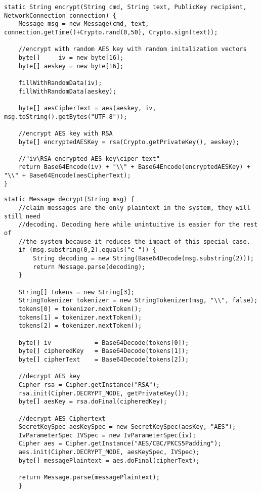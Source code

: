 \begin{lstlisting}
static String encrypt(String cmd, String text, PublicKey recipient, NetworkConnection connection) {
    Message msg = new Message(cmd, text, connection.getTime()+Crypto.rand(0,50), Crypto.sign(text));
    
    //encrypt with random AES key with random initalization vectors
    byte[]     iv = new byte[16];
    byte[] aeskey = new byte[16];
    
    fillWithRandomData(iv);
    fillWithRandomData(aeskey);
    
    byte[] aesCipherText = aes(aeskey, iv, msg.toString().getBytes("UTF-8"));
            
    //encrypt AES key with RSA
    byte[] encryptedAESKey = rsa(Crypto.getPrivateKey(), aeskey);
            
    //"iv\RSA encrypted AES key\ciper text"
    return Base64Encode(iv) + "\\" + Base64Encode(encryptedAESKey) + "\\" + Base64Encode(aesCipherText);
}
\end{lstlisting}

\begin{lstlisting}
static Message decrypt(String msg) {
    //claim messages are the only plaintext in the system, they will still need
    //decoding. Decoding here while unintuitive is easier for the rest of
    //the system because it reduces the impact of this special case.
    if (msg.substring(0,2).equals("c ")) {
        String decoding = new String(Base64Decode(msg.substring(2)));
        return Message.parse(decoding);
    }
        
    String[] tokens = new String[3];
    StringTokenizer tokenizer = new StringTokenizer(msg, "\\", false);
    tokens[0] = tokenizer.nextToken();
    tokens[1] = tokenizer.nextToken();
    tokens[2] = tokenizer.nextToken();
        
    byte[] iv            = Base64Decode(tokens[0]);
    byte[] cipheredKey   = Base64Decode(tokens[1]);
    byte[] cipherText    = Base64Decode(tokens[2]);
            
    //decrypt AES key
    Cipher rsa = Cipher.getInstance("RSA");
    rsa.init(Cipher.DECRYPT_MODE, getPrivateKey());
    byte[] aesKey = rsa.doFinal(cipheredKey);
            
    //decrypt AES Ciphertext
    SecretKeySpec aesKeySpec = new SecretKeySpec(aesKey, "AES");
    IvParameterSpec IVSpec = new IvParameterSpec(iv);
    Cipher aes = Cipher.getInstance("AES/CBC/PKCS5Padding");
    aes.init(Cipher.DECRYPT_MODE, aesKeySpec, IVSpec);
    byte[] messagePlaintext = aes.doFinal(cipherText);

    return Message.parse(messagePlaintext);
    }
\end{lstlisting}

